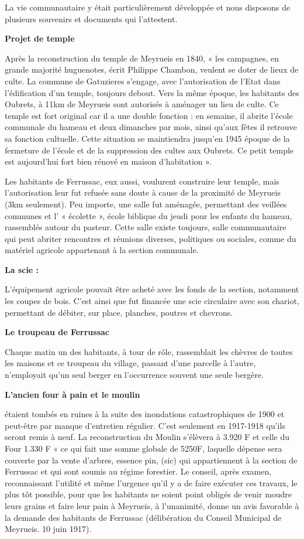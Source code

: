 La vie communautaire y était particulièrement développée et nous disposons de plusieurs souvenirs et
documents qui l’attestent.

\textbf{Projet de temple}

Après la reconstruction du temple de Meyrueis en 1840, « les campagnes, en
grande majorité huguenotes, écrit Philippe Chambon, veulent se doter de lieux de culte. La commune
de Gatuzieres s’engage, avec l’autorisation de l’Etat dans l’édification d’un temple, toujours debout.
Vers la même époque, les habitants des Oubrets, à 11km de Meyrueis sont autorisés à aménager un
lieu de culte. Ce temple est fort original car il a une double fonction : en semaine, il abrite l’école
communale du hameau et deux dimanches par mois, ainsi qu’aux fêtes il retrouve sa fonction cultuelle.
Cette situation se maintiendra jusqu’en 1945 époque de la fermeture de l’école et de la suppression
des cultes aux Oubrets. Ce petit temple est aujourd’hui fort bien rénové en maison d’habitation ».

Les habitants de Ferrussac, eux aussi, voulurent construire leur temple, mais l’autorisation leur fut
refusée sans doute à cause de la proximité de Meyrueis (3km seulement). Peu importe, une salle fut
aménagée, permettant des veillées communes et l’ « écolette », école biblique du jeudi pour les enfants
du hameau, rassemblés autour du pasteur. Cette salle existe toujours, salle communautaire qui peut
abriter rencontres et réunions diverses, politiques ou sociales, comme du matériel agricole appartenant
à la section communale.

\textbf{La scie :}

L’équipement agricole pouvait être acheté avec les fonds de la section, notamment les coupes
de bois. C’est ainsi que fut financée une scie circulaire avec son chariot, permettant de débiter, sur
place, planches, poutres et chevrons.

\textbf{Le troupeau de Ferrussac}

Chaque matin un des habitants, à tour de rôle, rassemblait les chèvres de
toutes les maisons et ce troupeau du village, passant d’une parcelle à l’autre, n’employait qu’un seul
berger en l’occurrence souvent une seule bergère.

\textbf{L’ancien four à pain et le moulin}

étaient tombés en ruines à la suite des inondations catastrophiques
de 1900 et peut-être par manque d’entretien régulier. C’est seulement en 1917-1918 qu’ils seront
remis à neuf. La reconstruction du Moulin s’élèvera à 3.920 F et celle du Four 1.330 F
« ce qui fait une somme globale de 5250F, laquelle dépense sera couverte par la vente d’arbres,
essence pin, (sic) qui appartiennent à la section de Ferrussac et qui sont soumis au régime forestier. Le
conseil, après examen, reconnaissant l’utilité et même l’urgence qu’il y a de faire exécuter ces travaux,
le plus tôt possible, pour que les habitants ne soient point obligés de venir moudre leurs grains et faire
leur pain à Meyrueis, à l’unanimité, donne un avis favorable à la demande des habitants de Ferrussac
(délibération du Conseil Municipal de Meyrueis. 10 juin 1917).


